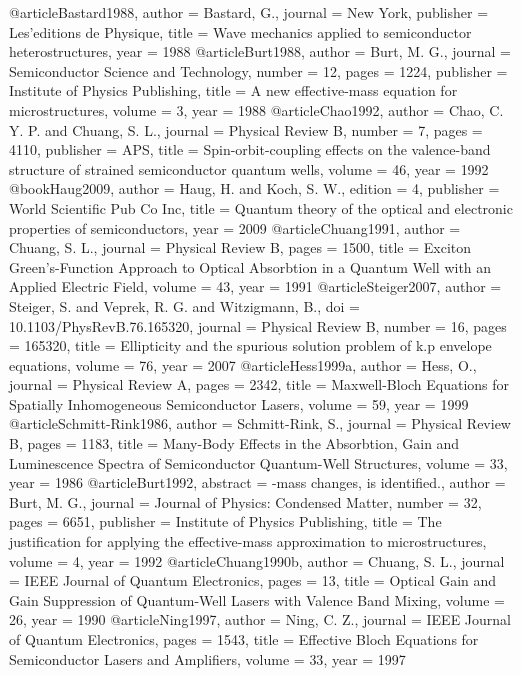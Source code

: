 @article{Bastard1988,
author = {Bastard, G.},
journal = {New York},
publisher = {Les'editions de Physique},
title = {{Wave mechanics applied to semiconductor heterostructures}},
year = {1988}
}
@article{Burt1988,
author = {Burt, M. G.},
journal = {Semiconductor Science and Technology},
number = {12},
pages = {1224},
publisher = {Institute of Physics Publishing},
title = {{A new effective-mass equation for microstructures}},
volume = {3},
year = {1988}
}
@article{Chao1992,
author = {Chao, C. Y. P. and Chuang, S. L.},
journal = {Physical Review B},
number = {7},
pages = {4110},
publisher = {APS},
title = {{Spin-orbit-coupling effects on the valence-band structure of strained semiconductor quantum wells}},
volume = {46},
year = {1992}
}
@book{Haug2009,
author = {Haug, H. and Koch, S. W.},
edition = {4},
publisher = {World Scientific Pub Co Inc},
title = {{Quantum theory of the optical and electronic properties of semiconductors}},
year = {2009}
}
@article{Chuang1991,
author = {Chuang, S. L.},
journal = {Physical Review B},
pages = {1500},
title = {{Exciton Green's-Function Approach to Optical Absorbtion in a Quantum Well with an Applied Electric Field}},
volume = {43},
year = {1991}
}
@article{Steiger2007,
author = {Steiger, S. and Veprek, R. G. and Witzigmann, B.},
doi = {10.1103/PhysRevB.76.165320},
journal = {Physical Review B},
number = {16},
pages = {165320},
title = {{Ellipticity and the spurious solution problem of k.p envelope equations}},
volume = {76},
year = {2007}
}
@article{Hess1999a,
author = {Hess, O.},
journal = {Physical Review A},
pages = {2342},
title = {{Maxwell-Bloch Equations for Spatially Inhomogeneous Semiconductor Lasers}},
volume = {59},
year = {1999}
}
@article{Schmitt-Rink1986,
author = {Schmitt-Rink, S.},
journal = {Physical Review B},
pages = {1183},
title = {{Many-Body Effects in the Absorbtion, Gain and Luminescence Spectra of Semiconductor Quantum-Well Structures}},
volume = {33},
year = {1986}
}
@article{Burt1992,
abstract = {-mass changes, is identified.},
author = {Burt, M. G.},
journal = {Journal of Physics: Condensed Matter},
number = {32},
pages = {6651},
publisher = {Institute of Physics Publishing},
title = {{The justification for applying the effective-mass approximation to microstructures}},
volume = {4},
year = {1992}
}
@article{Chuang1990b,
author = {Chuang, S. L.},
journal = {IEEE Journal of Quantum Electronics},
pages = {13},
title = {{Optical Gain and Gain Suppression of Quantum-Well Lasers with Valence Band Mixing}},
volume = {26},
year = {1990}
}
@article{Ning1997,
author = {Ning, C. Z.},
journal = {IEEE Journal of Quantum Electronics},
pages = {1543},
title = {{Effective Bloch Equations for Semiconductor Lasers and Amplifiers}},
volume = {33},
year = {1997}
}
